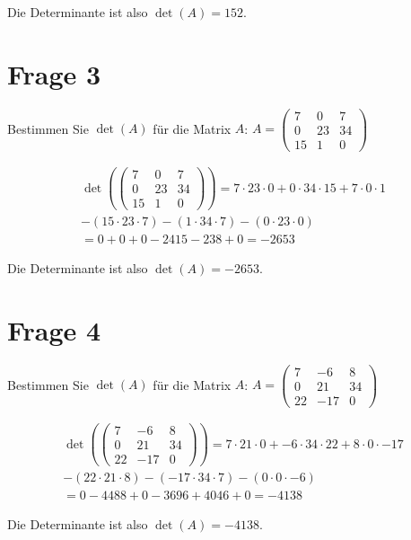 Die Determinante ist also $\det(A) = 152$.

\section{Frage 3}

Bestimmen Sie $\det(A)$ für die Matrix $A$: $A = \begin{pmatrix}
        7  & 0  & 7  \\
        0  & 23 & 34 \\
        15 & 1  & 0
    \end{pmatrix}$

\begin{align*}
    \det\left(\begin{pmatrix}
                  7  & 0  & 7  \\
                  0  & 23 & 34 \\
                  15 & 1  & 0
              \end{pmatrix}\right) = 7 \cdot 23 \cdot 0 + 0 \cdot 34 \cdot 15 + 7 \cdot 0 \cdot 1 \\
               - (15 \cdot 23 \cdot 7) - (1 \cdot 34 \cdot 7) - (0 \cdot 23 \cdot 0) \\
               = 0 + 0 + 0 - 2415 - 238 + 0 = -2653
\end{align*}

Die Determinante ist also $\det(A) = -2653$.

\section{Frage 4}

Bestimmen Sie $\det(A)$ für die Matrix $A$: $A = \begin{pmatrix}
        7  & -6  & 8  \\
        0  & 21  & 34 \\
        22 & -17 & 0
    \end{pmatrix}$

\begin{align*}
    \det\left(\begin{pmatrix}
                  7  & -6  & 8  \\
                  0  & 21  & 34 \\
                  22 & -17 & 0
              \end{pmatrix}\right) = 7 \cdot 21 \cdot 0 + -6 \cdot 34 \cdot 22 + 8 \cdot 0 \cdot -17 \\
    - (22 \cdot 21 \cdot 8) - (-17 \cdot 34 \cdot 7) - (0 \cdot 0 \cdot -6)                          \\
    = 0 - 4488 + 0 - 3696 + 4046 + 0 = -4138
\end{align*}

Die Determinante ist also $\det(A) = -4138$.

